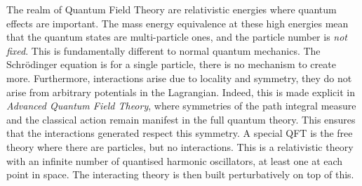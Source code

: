 The realm of Quantum Field Theory are relativistic energies where quantum effects are important. The mass energy equivalence at these high energies mean that the quantum states are multi-particle ones, and the particle number is \emph{not fixed}. This is fundamentally different to normal quantum mechanics. The Schr{\"o}dinger equation is for a single particle, there is no mechanism to create more. Furthermore, interactions arise due to locality and symmetry, they do not arise from arbitrary potentials in the Lagrangian. Indeed, this is made explicit in \emph{Advanced Quantum Field Theory}, where symmetries of the path integral measure and the classical action remain manifest in the full quantum theory. This ensures that the interactions generated respect this symmetry. A special QFT is the free theory where there are particles, but no interactions. This is a relativistic theory with an infinite number of quantised harmonic oscillators, at least one at each point in space. The interacting theory is then built perturbatively on top of this.

